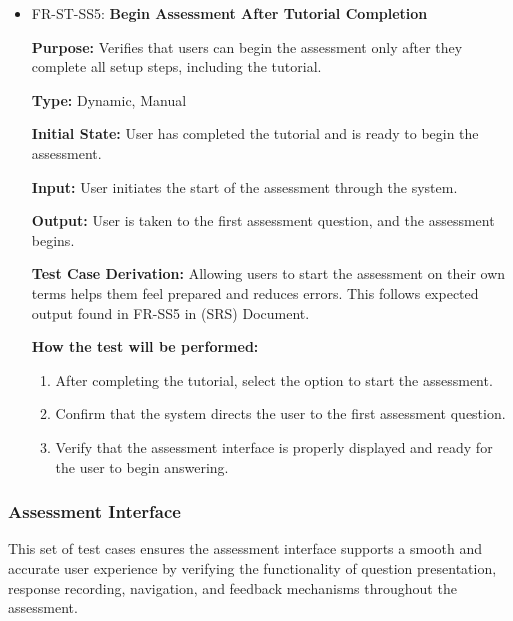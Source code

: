 \documentclass[12pt, titlepage]{article}
\begin{document}
\begin{itemize}
  \item FR-ST-SS5: \textbf{Begin Assessment After Tutorial Completion}
  \begin{mdframed}[linewidth=0.5mm]
      \textbf{Purpose:} Verifies that users can begin the assessment only after they complete all setup steps, including the tutorial. \par
      \textbf{Type:} Dynamic, Manual \par
      \textbf{Initial State:} User has completed the tutorial and is ready to begin the assessment. \par
      \textbf{Input:} User initiates the start of the assessment through the system. \par
      \textbf{Output:} User is taken to the first assessment question, and the assessment begins. \par
      \textbf{Test Case Derivation:} Allowing users to start the assessment on their own terms helps them feel prepared and reduces errors. 
      This follows expected output found in FR-SS5 in (SRS) Document. \par
      \textbf{How the test will be performed:}
      \begin{enumerate}[noitemsep]
        \item After completing the tutorial, select the option to start the assessment.
        \item Confirm that the system directs the user to the first assessment question.
        \item Verify that the assessment interface is properly displayed and ready for the user to begin answering.
      \end{enumerate}
  \end{mdframed}
\end{itemize}

\subsubsection{Assessment Interface}

\hspace{2em}This set of test cases ensures the assessment interface supports a smooth and accurate user experience by verifying the 
functionality of question presentation, response recording, navigation, and feedback mechanisms throughout the assessment.
\end{document}

